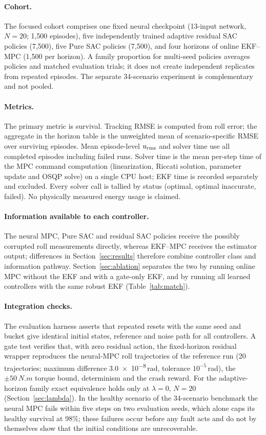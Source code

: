 \documentclass[preprint,12pt,authoryear=false]{elsarticle}
\theoremstyle{remark}\newtheorem{remark}{Remark}
\theoremstyle{plain}\newtheorem{proposition}{Proposition}\newtheorem{lemma}{Lemma}
\theoremstyle{definition}\newtheorem{assumption}{Assumption}
\begin{document}
\paragraph{Cohort.} The focused cohort comprises one fixed neural checkpoint (13-input network, $N=20$; 1{,}500 episodes), five independently trained adaptive residual SAC policies (7{,}500), five Pure SAC policies (7{,}500), and four horizons of online EKF--MPC (1{,}500 per horizon). A family proportion for multi-seed policies averages policies and matched evaluation trials; it does not create independent replicates from repeated episodes. The separate 34-scenario experiment is complementary and not pooled.

\paragraph{Metrics.} The primary metric is survival. Tracking RMSE is computed from roll error; the aggregate in the horizon table is the unweighted mean of scenario-specific RMSE over surviving episodes. Mean episode-level $u_{\rm rms}$ and solver time use all completed episodes including failed runs. Solver time is the mean per-step time of the MPC command computation (linearization, Riccati solution, parameter update and OSQP solve) on a single CPU host; EKF time is recorded separately and excluded. Every solver call is tallied by status (optimal, optimal inaccurate, failed). No physically measured energy usage is claimed.

\paragraph{Information available to each controller.} The neural MPC, Pure SAC and residual SAC policies receive the possibly corrupted roll measurements directly, whereas EKF--MPC receives the estimator output; differences in Section~\ref{sec:results} therefore combine controller class and information pathway. Section~\ref{sec:ablation} separates the two by running online MPC without the EKF and with a gate-only EKF, and by running all learned controllers with the same robust EKF (Table~\ref{tab:match}).

\paragraph{Integration checks.} The evaluation harness asserts that repeated resets with the same seed and bucket give identical initial states, reference and noise path for all controllers. A gate test verifies that, with zero residual action, the fixed-horizon residual wrapper reproduces the neural-MPC roll trajectories of the reference run (20 trajectories; maximum difference \num{3.0e-8}\,rad, tolerance $10^{-5}$\,rad), the $\pm\SI{50}{N.m}$ torque bound, determinism and the crash reward. For the adaptive-horizon family exact equivalence holds only at $\lambda=0$, $N=20$ (Section~\ref{sec:lambda}). In the healthy scenario of the 34-scenario benchmark the neural MPC fails within five steps on two evaluation seeds, which alone caps its healthy survival at 98\%; these failures occur before any fault acts and do not by themselves show that the initial conditions are unrecoverable.
\end{document}
